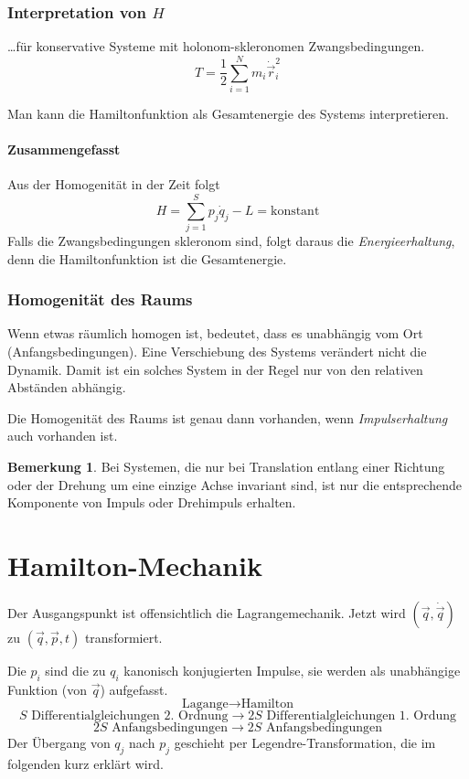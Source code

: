 \documentclass[oneside]{book}
\theoremstyle{definition}
\newtheorem*{bemerkung*}{Bemerkung}
\newcommand{\dotvec}[1]{\dot{\vec{#1}}}
\newcommand{\const}{\text{konstant}}
\begin{document}
\subsubsection{Interpretation von $H$} \dots für konservative Systeme mit holonom-skleronomen Zwangsbedingungen.
$$T = \frac12 \sum_{i=1}^N m_i \dotvec{r}_i^2$$

Man kann die Hamiltonfunktion als Gesamtenergie des Systems interpretieren.






\paragraph{Zusammengefasst}
Aus der Homogenität in der Zeit folgt
\[H=\sum\limits_{j=1}^S p_j\dot q_j - L = \const\]
Falls die Zwangsbedingungen skleronom sind, folgt daraus die \emph{Energieerhaltung}, denn die Hamiltonfunktion ist die Gesamtenergie.

\subsubsection{Homogenität des Raums}
Wenn etwas räumlich homogen ist, bedeutet, dass es unabhängig vom Ort (Anfangsbedingungen). Eine Verschiebung des Systems verändert nicht die Dynamik. Damit ist ein solches System in der Regel nur von den relativen Abständen abhängig.

Die Homogenität des Raums ist genau dann vorhanden, wenn \emph{Impulserhaltung} auch vorhanden ist.


\begin{bemerkung*}
	Bei Systemen, die nur bei Translation entlang einer Richtung oder der Drehung um eine einzige Achse invariant sind, ist nur die entsprechende Komponente von Impuls oder Drehimpuls erhalten.
\end{bemerkung*}

\section{Hamilton-Mechanik}
Der Ausgangspunkt ist offensichtlich die Lagrangemechanik. Jetzt wird $(\vec q, \dot {\vec q})$ zu $(\vec q, \vec p, t)$ transformiert.

Die $p_i$ sind die zu $q_i$ kanonisch konjugierten Impulse, sie werden als unabhängige Funktion (von $\vec q$) aufgefasst.
\[\text{Lagange}\to\text{Hamilton}\]
\[\text{$S$ Differentialgleichungen 2. Ordnung}\to\text{$2S$ Differentialgleichungen 1. Ordung}\]
\[\text{$2S$ Anfangsbedingungen}\to\text{$2S$ Anfangsbedingungen}\]
Der Übergang von $q_j$ nach $p_j$ geschieht per Legendre-Transformation, die im folgenden kurz erklärt wird.
\end{document}
